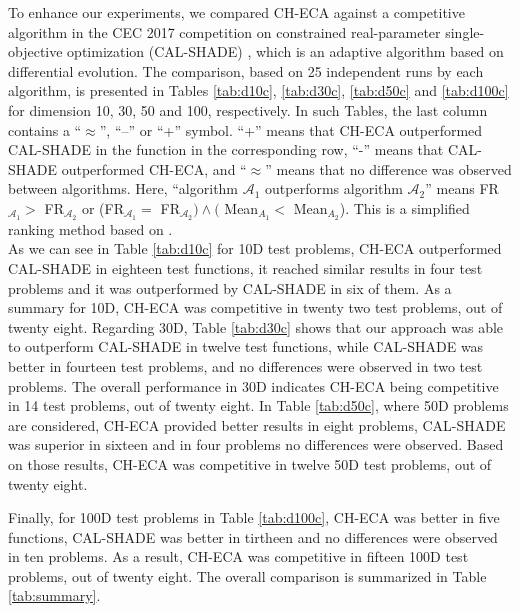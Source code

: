 \documentclass[conference]{IEEEtran}
\begin{document}
To enhance our experiments, we compared CH-ECA against a  competitive algorithm 
in the CEC 2017 competition on constrained real-parameter single-objective 
optimization (CAL-SHADE) \cite{zamuda2017adaptive}, which is an adaptive algorithm 
based on differential evolution. The comparison, based on 25 independent runs by 
each algorithm, is presented in Tables \ref{tab:d10c}, \ref{tab:d30c}, \ref{tab:d50c} 
and \ref{tab:d100c} for dimension 10, 30, 50 and 100, respectively. In such Tables, 
the last column contains a ``$\approx$'', ``--'' or ``+'' symbol. ``+'' means that 
CH-ECA outperformed CAL-SHADE in the function  	in the corresponding row, ``-'' 
means that CAL-SHADE outperformed CH-ECA, and  ``$\approx$'' means that no difference 
was observed between algorithms. Here, ``algorithm $\mathcal{A}_1$ outperforms 
algorithm $\mathcal{A}_2$'' means FR$_{\mathcal{A}_1} > $ FR$_{\mathcal{A}_2}$ 
or (FR$_{\mathcal{A}_1} = $ FR$_{\mathcal{A}_2}) \wedge ($ Mean$_{A_1} < $ Mean$_{A_2}$). 
This is a simplified ranking method based on \cite{cecCop17}. \\

As we can see in Table \ref{tab:d10c} for 10D test problems, CH-ECA outperformed 
CAL-SHADE in eighteen test functions, it reached similar results in four test 
problems and it was outperformed by CAL-SHADE in six of them. As a summary for 
10D, CH-ECA was competitive in twenty two test problems, out of twenty eight. %
%
Regarding 30D, Table \ref{tab:d30c} shows that our approach was able to outperform 
CAL-SHADE in twelve test functions, while CAL-SHADE was better in fourteen test 
problems, and no differences were observed in two test problems. The overall 
performance in 30D indicates CH-ECA being competitive in 14 test problems, out 
of twenty eight. 
%
In Table \ref{tab:d50c}, where 50D problems are considered, CH-ECA provided better 
results in eight problems, CAL-SHADE was superior in sixteen and in four problems 
no differences were observed. Based on those results, CH-ECA was competitive in 
twelve 50D test problems, out of twenty eight. 

Finally, for 100D test problems in Table \ref{tab:d100c}, CH-ECA was better in 
five functions, CAL-SHADE was better in tirtheen and no differences were observed 
in ten problems. As a result, CH-ECA was competitive in fifteen 100D test problems, 
out of twenty eight. The overall comparison is summarized in Table \ref{tab:summary}.
\end{document}
